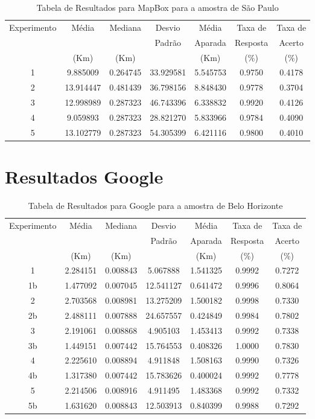 \begin{anexosenv}
\begin{table}[ht]
\centering
\begin{tabular}{|c|c|c|c|c|c|c|}
\hline
Experimento & Média & Mediana & Desvio & Média & Taxa de & Taxa de \\
 & & & Padrão & Aparada & Resposta & Acerto \\
 & (Km) & (Km) & & (Km) & (\%) & (\%) \\ \hline
1 & 9.885009 & 0.264745 & 33.929581 & 5.545753 & 0.9750 & 0.4178 \\ \hline
2 & 13.914447 & 0.481439 & 36.798156 & 8.848430 & 0.9778 & 0.3704 \\ \hline
3 & 12.998989 & 0.287323 & 46.743396 & 6.338832 & 0.9920 & 0.4126 \\ \hline
4 & 9.059893 & 0.287323 & 28.821270 & 5.833966 & 0.9784 & 0.4090 \\ \hline
5 & 13.102779 & 0.287323 & 54.305399 & 6.421116 & 0.9800 & 0.4010 \\ \hline
\end{tabular}
\caption{Tabela de Resultados para MapBox para a amostra de São Paulo}
\label{tab:mapboxSP}
\end{table}
    

\section{Resultados Google}

\begin{table}[ht]
\centering
\begin{tabular}{|c|c|c|c|c|c|c|}
\hline
Experimento & Média & Mediana & Desvio & Média & Taxa de & Taxa de \\
 & & & Padrão & Aparada & Resposta & Acerto \\
 & (Km) & (Km) & & (Km) & (\%) & (\%) \\ \hline
1 & 2.284151 & 0.008843 & 5.067888 & 1.541325 & 0.9992 & 0.7272 \\ \hline
1b & 1.477092 & 0.007045 & 12.541127 & 0.641472 & 0.9996 & 0.8064 \\ \hline
2 & 2.703568 & 0.008981 & 13.275209 & 1.500182 & 0.9998 & 0.7330 \\ \hline
2b & 2.488111 & 0.007888 & 24.657557 & 0.424849 & 0.9984 & 0.7802 \\ \hline
3 & 2.191061 & 0.008868 & 4.905103 & 1.453413 & 0.9992 & 0.7338 \\ \hline
3b & 1.449151 & 0.007442 & 15.764553 & 0.408326 & 1.0000 & 0.7830 \\ \hline
4 & 2.225610 & 0.008894 & 4.911848 & 1.508163 & 0.9990 & 0.7326 \\ \hline
4b & 1.317380 & 0.007442 & 15.783626 & 0.400024 & 0.9992 & 0.7778 \\ \hline
5 & 2.214506 & 0.008916 & 4.911495 & 1.483368 & 0.9992 & 0.7332 \\ \hline
5b & 1.631620 & 0.008843 & 12.503913 & 0.840399 & 0.9988 & 0.7292 \\ \hline
\end{tabular}
\caption{Tabela de Resultados para Google para a amostra de Belo Horizonte}
\label{tab:googleBH}
\end{table}


\end{anexosenv}
